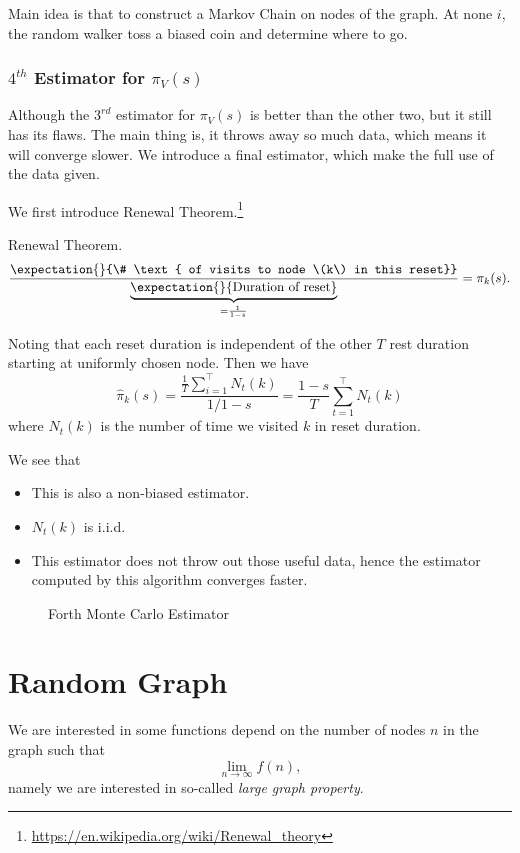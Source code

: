 \begin{prev}
	Main idea is that to construct a Markov Chain on nodes of the graph. At none \(i\), the random walker toss a biased coin and
	determine where to go.
\end{prev}

\subsection{\(4^{th}\) Estimator for \(\pi_V(s)\)}
Although the \(3^{rd}\) estimator for \(\pi_V(s)\) is better than the other two, but it still has its flaws. The main thing is, it throws away so much
data, which means it will converge slower. We introduce a final estimator, which make the full use of the data given.

We first introduce Renewal Theorem.\footnote{\url{https://en.wikipedia.org/wiki/Renewal_theory}}
\begin{theorem}
	Renewal Theorem.
	\[
		\frac{\expectation{}{\# \text{ of visits to node \(k\) in this reset}} }{\underbrace{\expectation{}{\text{Duration of reset}}}_{= \frac{1}{1-s}}} = \pi_k(s).
	\]

	Noting that each reset duration is independent of the other \(T\) rest duration starting at uniformly chosen node. Then we have
	\[
		\hat{\pi}_k(s) = \frac{\frac{1}{T}\sum\limits_{i=1}^{\top} N_t(k)}{1/1-s} = \frac{1-s}{T}\sum\limits_{t=1}^{\top} N_t(k)
	\]
	where \(N_t(k)\) is the number of time we visited \(k\) in reset duration.
\end{theorem}

\begin{remark}
	We see that
	\begin{itemize}
		\item This is also a non-biased estimator.
		\item \(N_t(k)\) is i.i.d.
		\item This estimator does not throw out those useful data, hence the estimator computed by this algorithm converges faster.
	\end{itemize}
\end{remark}

\begin{figure}[H]
	\centering
	\caption{Forth Monte Carlo Estimator}
	\label{fig:Monte-Carlo-Estimator-4}
\end{figure}

\chapter{Random Graph}
We are interested in some functions depend on the number of nodes \(n\) in the graph such that
\[
	\lim_{n\to \infty }f(n),
\]
namely we are interested in so-called \emph{large graph property}.

